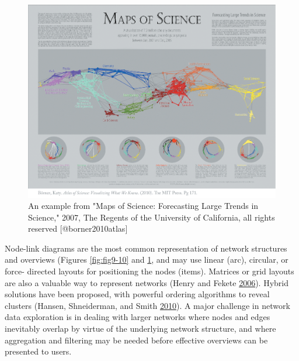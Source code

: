 \documentclass[]{krantz}
\begin{document}
\begin{figure}

{\centering \includegraphics[width=0.9\linewidth]{ChapterViz/figures/fig9-10b} 

}

\caption{An example from "Maps of Science: Forecasting Large Trends in Science," 2007, The Regents of the University of California, all rights reserved [@borner2010atlas]}\label{fig:fig9-10b}
\end{figure}

Node-link diagrams are the most common representation of network
structures and overviews (Figures \ref{fig:fig9-10} and
\ref{fig:fig9-10b}, and may use linear (arc), circular, or force-
directed layouts for positioning the nodes (items). Matrices or grid
layouts are also a valuable way to represent networks (Henry and Fekete
\protect\hyperlink{ref-henry2006matrixexplorer}{2006}). Hybrid solutions
have been proposed, with powerful ordering algorithms to reveal clusters
(Hansen, Shneiderman, and Smith
\protect\hyperlink{ref-hansen2010analyzing}{2010}). A major challenge in
network data exploration is in dealing with larger networks where nodes
and edges inevitably overlap by virtue of the underlying network
structure, and where aggregation and filtering may be needed before
effective overviews can be presented to users.
\end{document}
